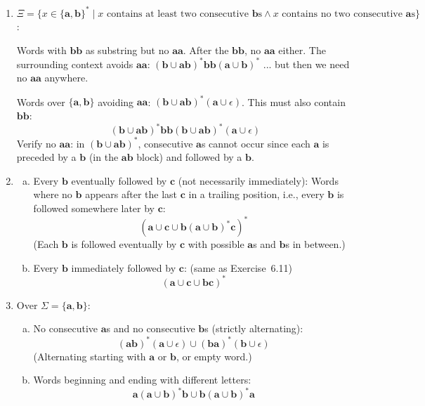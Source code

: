 \begin{enumerate}[{6.}1.]
\item $\Xi=\{x\in\{\pmb{a},\pmb{b}\}^*\mid x\text{ contains at least two consecutive }\pmb{b}\text{s}\wedge x\text{ contains no two consecutive }\pmb{a}\text{s}\}$:

Words with $\pmb{bb}$ as substring but no $\pmb{aa}$.  After the $\pmb{bb}$, no $\pmb{aa}$ either.  The surrounding context avoids $\pmb{aa}$: $(\pmb{b}\cup\pmb{ab})^*\pmb{bb}(\pmb{a}\cup\pmb{b})^*$ ... but then we need no $\pmb{aa}$ anywhere.

Words over $\{\pmb{a},\pmb{b}\}$ avoiding $\pmb{aa}$: $(\pmb{b}\cup\pmb{ab})^*(\pmb{a}\cup\epsilon)$.  This must also contain $\pmb{bb}$:
\[
  (\pmb{b}\cup\pmb{ab})^*\pmb{bb}(\pmb{b}\cup\pmb{ab})^*(\pmb{a}\cup\epsilon)
\]
Verify no $\pmb{aa}$: in $(\pmb{b}\cup\pmb{ab})^*$, consecutive $\pmb{a}$s cannot occur since each $\pmb{a}$ is preceded by a $\pmb{b}$ (in the $\pmb{ab}$ block) and followed by a $\pmb{b}$.

\item \begin{enumerate}[(a)]
  \item Every $\pmb{b}$ eventually followed by $\pmb{c}$ (not necessarily immediately):
  Words where no $\pmb{b}$ appears after the last $\pmb{c}$ in a trailing position, i.e., every $\pmb{b}$ is followed somewhere later by $\pmb{c}$:
  \[
    (\pmb{a}\cup\pmb{c}\cup\pmb{b}(\pmb{a}\cup\pmb{b})^*\pmb{c})^*
  \]
  (Each $\pmb{b}$ is followed eventually by $\pmb{c}$ with possible $\pmb{a}$s and $\pmb{b}$s in between.)

  \item Every $\pmb{b}$ immediately followed by $\pmb{c}$: (same as Exercise~6.11)
  \[
    (\pmb{a}\cup\pmb{c}\cup\pmb{bc})^*
  \]
\end{enumerate}

\item Over $\Sigma=\{\pmb{a},\pmb{b}\}$:

\begin{enumerate}[(a)]
  \item No consecutive $\pmb{a}$s and no consecutive $\pmb{b}$s (strictly alternating):
  \[
    (\pmb{ab})^*(\pmb{a}\cup\epsilon) \cup (\pmb{ba})^*(\pmb{b}\cup\epsilon)
  \]
  (Alternating starting with $\pmb{a}$ or $\pmb{b}$, or empty word.)

  \item Words beginning and ending with different letters:
  \[
    \pmb{a}(\pmb{a}\cup\pmb{b})^*\pmb{b} \cup \pmb{b}(\pmb{a}\cup\pmb{b})^*\pmb{a}
  \]


\end{enumerate}
\end{enumerate}
